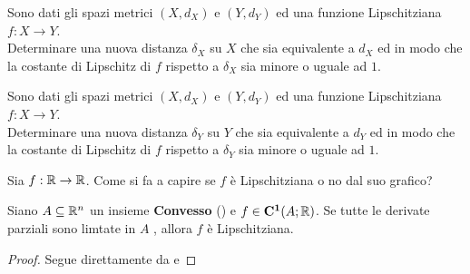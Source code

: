 \begin{example}
	Sono dati gli spazi metrici $(X,d_X)$ e $(Y,d_Y)$ ed una funzione Lipschitziana $f: X \to Y$.\\
	Determinare una nuova distanza $\delta_X$ su $X$ che sia equivalente a $d_X$ ed in modo che la costante di Lipschitz di $f$ rispetto a $\delta_X$ sia minore o uguale ad $1$.
\end{example}
\begin{example}
	Sono dati gli spazi metrici $(X,d_X)$ e $(Y,d_Y)$ ed una funzione Lipschitziana $f: X \to Y$.\\
	Determinare una nuova distanza $\delta_Y$ su $Y$ che sia equivalente a $d_Y$ ed in modo che la costante di Lipschitz di $f$ rispetto a $\delta_Y$ sia minore o uguale ad $1$.
\end{example}
\begin{exercise}
	Sia $f: \mathbb{R} \to \mathbb{R}$. Come si fa a capire se $f$ è Lipschitziana o no dal suo grafico?
\end{exercise}

\begin{proposition}
	\label{prop:convesso_deriv_par_lim_allora_lips}
	Siano $A \subseteq \mathbb{R}^n$ un insieme \textbf{Convesso} () e $f \in \mathbf{C^{1}}(A;\mathbb{R})$. Se tutte le derivate parziali sono limtate in $A$ , allora $f$ è Lipschitziana.
	\begin{proof}
		Segue direttamente da  e 
	\end{proof}
\end{proposition}

